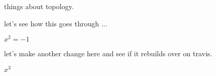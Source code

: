 things about topology.

let's see how this goes through ...

$x^2 = -1$

let's make another change here and see if it rebuilds over on travis.

$x^3$